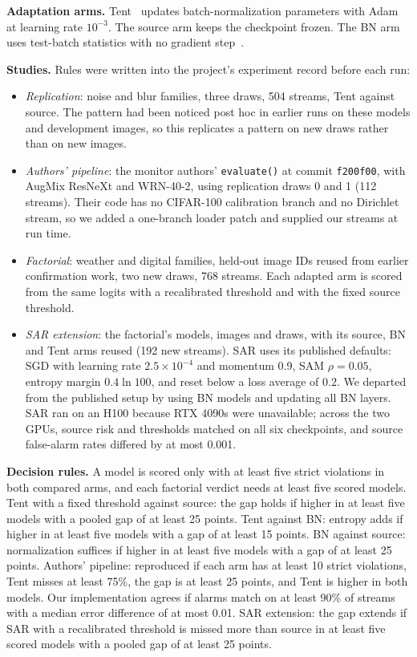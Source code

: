 \documentclass[runningheads]{llncs}
\begin{document}
\textbf{Adaptation arms.} Tent~\cite{Wang2021Tent} updates batch-normalization parameters with Adam at learning rate $10^{-3}$. The source arm keeps the checkpoint frozen. The BN arm uses test-batch statistics with no gradient step~\cite{Schneider2020BNAdapt}.

\textbf{Studies.} Rules were written into the project's experiment record before each run:
\begin{itemize}
\item \emph{Replication}: noise and blur families, three draws, 504 streams, Tent against source. The pattern had been noticed post hoc in earlier runs on these models and development images, so this replicates a pattern on new draws rather than on new images.
\item \emph{Authors' pipeline}: the monitor authors' \texttt{evaluate()} at commit \texttt{f200f00}, with AugMix ResNeXt and WRN-40-2, using replication draws 0 and 1 (112 streams). Their code has no CIFAR-100 calibration branch and no Dirichlet stream, so we added a one-branch loader patch and supplied our streams at run time.
\item \emph{Factorial}: weather and digital families, held-out image IDs reused from earlier confirmation work, two new draws, 768 streams. Each adapted arm is scored from the same logits with a recalibrated threshold and with the fixed source threshold.
\item \emph{SAR extension}: the factorial's models, images and draws, with its source, BN and Tent arms reused (192 new streams). SAR uses its published defaults: SGD with learning rate $2.5\times10^{-4}$ and momentum 0.9, SAM $\rho=0.05$, entropy margin $0.4\ln 100$, and reset below a loss average of 0.2. We departed from the published setup by using BN models and updating all BN layers. SAR ran on an H100 because RTX 4090s were unavailable; across the two GPUs, source risk and thresholds matched on all six checkpoints, and source false-alarm rates differed by at most 0.001.
\end{itemize}

\textbf{Decision rules.} A model is scored only with at least five strict violations in both compared arms, and each factorial verdict needs at least five scored models. Tent with a fixed threshold against source: the gap holds if higher in at least five models with a pooled gap of at least 25 points. Tent against BN: entropy adds if higher in at least five models with a gap of at least 15 points. BN against source: normalization suffices if higher in at least five models with a gap of at least 25 points. Authors' pipeline: reproduced if each arm has at least 10 strict violations, Tent misses at least 75\%, the gap is at least 25 points, and Tent is higher in both models. Our implementation agrees if alarms match on at least 90\% of streams with a median error difference of at most 0.01. SAR extension: the gap extends if SAR with a recalibrated threshold is missed more than source in at least five scored models with a pooled gap of at least 25 points.
\end{document}

